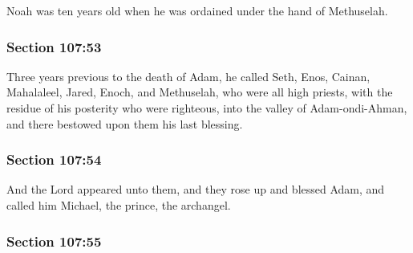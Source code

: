 		Noah was ten years old when he was ordained under the hand of Methuselah.


	\subsubsection{Section 107:53} %
		\label{DC107-53}

		Three years previous to the death of Adam, he called Seth, Enos, Cainan, Mahalaleel, Jared, Enoch, and Methuselah, who were all high priests, with the residue of his posterity who were righteous, into the valley of Adam-ondi-Ahman, and there bestowed upon them his last blessing.


	\subsubsection{Section 107:54} %
		\label{DC107-54}

		And the Lord appeared unto them, and they rose up and blessed Adam, and called him Michael, the prince, the archangel.


	\subsubsection{Section 107:55} %
		\label{DC107-55}

